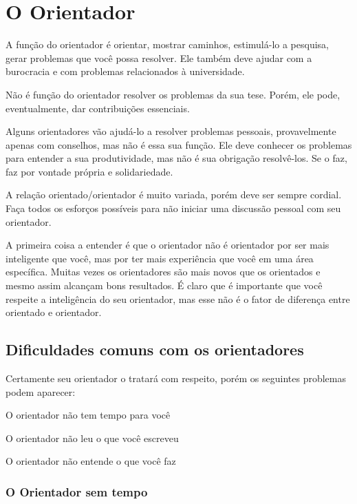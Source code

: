 \chapter{O Orientador}


A função do orientador é orientar, mostrar caminhos, estimulá-lo a pesquisa, gerar problemas que você possa resolver. Ele também deve ajudar com a burocracia e com problemas relacionados à universidade. 


Não é função do orientador resolver os problemas da sua tese. Porém, ele pode, eventualmente, dar contribuições essenciais.


Alguns orientadores vão ajudá-lo a resolver problemas pessoais, provavelmente apenas com conselhos, mas não é essa sua função. Ele deve conhecer os problemas para entender a sua produtividade, mas não é sua obrigação resolvê-los. Se o faz, faz por vontade própria e solidariedade.


A relação orientado/orientador é muito variada, porém deve ser sempre cordial. Faça todos os esforços possíveis para não iniciar uma discussão pessoal com seu orientador. 




A primeira coisa a entender é que o orientador não é orientador por ser mais inteligente que você, mas por ter mais experiência que você em uma área específica. Muitas vezes os orientadores são mais novos que os orientados e mesmo assim alcançam bons resultados. É claro que é importante que você respeite a inteligência do seu orientador, mas esse não é o fator de diferença entre orientado e orientador.


\section{Dificuldades comuns com os orientadores}


Certamente seu orientador o tratará com respeito, porém os seguintes problemas podem aparecer:

\begin{outline}
\1	O orientador não tem tempo para você


\1	O orientador não leu o que você escreveu


\1	O orientador não entende o que você faz
\end{outline}

\subsection{O Orientador sem tempo}


